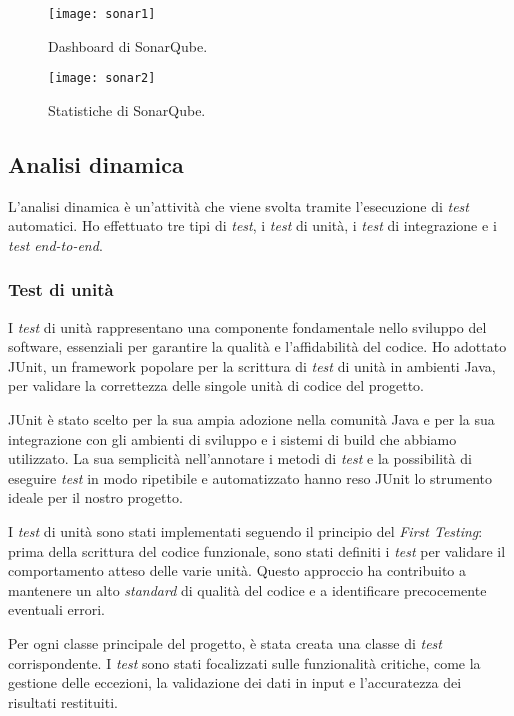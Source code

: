 \begin{figure}[h]
  \centering
  \begin{minipage}{0.49\textwidth}
      \centering
      \texttt{[image: sonar1]} 
      \caption{Dashboard di SonarQube.}
      \label{fig:sonar1}
  \end{minipage}\hfill
  \begin{minipage}{0.49\textwidth}
    \centering
    \texttt{[image: sonar2]}
    \caption{Statistiche di SonarQube.}
    \label{fig:sonar2}
  \end{minipage}
\end{figure}

\subsection*{Analisi dinamica}
L'analisi dinamica è un'attività che viene svolta tramite l'esecuzione di \textit{test} automatici.
Ho effettuato tre tipi di \textit{test}, i \textit{test} di unità, i \textit{test} di integrazione e i \textit{test} \textit{end-to-end}.\\
\subsubsection*{Test di unità}
I \textit{test} di unità rappresentano una componente fondamentale nello sviluppo del software, 
essenziali per garantire la qualità e l'affidabilità del codice. 
Ho adottato JUnit, un framework popolare per la scrittura di \textit{test} di unità in ambienti Java, 
per validare la correttezza delle singole unità di codice del progetto.

JUnit è stato scelto per la sua ampia adozione nella comunità Java e per la sua integrazione con gli ambienti di sviluppo e i sistemi di build che abbiamo utilizzato. La sua semplicità nell'annotare i metodi di \textit{test} e la possibilità di eseguire \textit{test} in modo ripetibile e automatizzato hanno reso JUnit lo strumento ideale per il nostro progetto.

I \textit{test} di unità sono stati implementati seguendo il principio del \textit{First Testing}: 
prima della scrittura del codice funzionale, sono stati definiti i \textit{test} per validare il comportamento atteso delle varie unità. 
Questo approccio ha contribuito a mantenere un alto \textit{standard} di qualità del codice e a identificare precocemente eventuali errori.

Per ogni classe principale del progetto, è stata creata una classe di \textit{test} corrispondente. 
I \textit{test} sono stati focalizzati sulle funzionalità critiche, come la gestione delle eccezioni, 
la validazione dei dati in input e l'accuratezza dei risultati restituiti.

